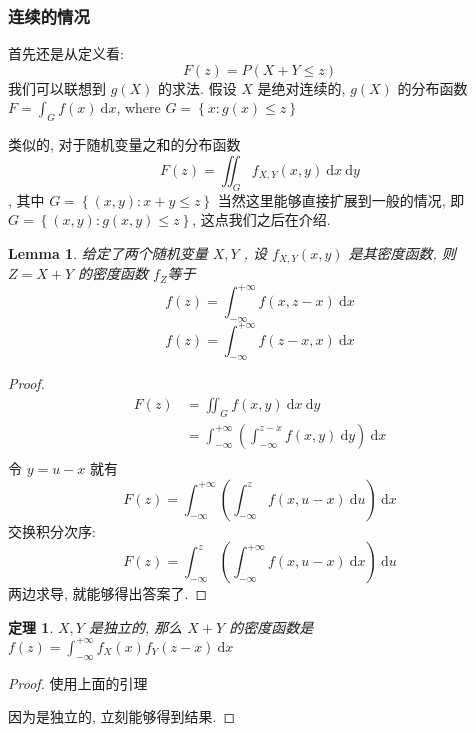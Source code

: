 \documentclass[a4paper, 10pt]{ctexart} %
\newtheorem{theorem}{定理}
\newtheorem{lemma}{Lemma}
\begin{document}
\subsubsection{连续的情况}
首先还是从定义看:
\[
F \left(z\right) = P\left(X + Y \le z\right)
\]
我们可以联想到 $g \left(X\right)$ 的求法. 假设 $X$ 是绝对连续的, $g\left(X\right)$ 的分布函数 $\displaystyle F = \int _{G} f \left(x \right) \ \mathrm{d}x$, where $G = \left\{ x: g\left(x\right) \le z\right\}$

类似的, 对于随机变量之和的分布函数
\[ \displaystyle F \left(z\right) = \iint _{G} f_{X , Y} \left(x,  y\right) \ \mathrm{d}x \ \mathrm{d}y\] , 其中 $G = \left\{ \left(x,  y\right) : x + y \le z\right\}$
当然这里能够直接扩展到一般的情况, 即 $G=  \left\{ \left( x,  y\right) : g\left(x , y\right) \le z\right\}$, 这点我们之后在介绍.
\begin{lemma}
    给定了两个随机变量 $X, Y$ , 设 $f _{X,   Y   } \left(x,  y\right)$ 是其密度函数, 则 $Z = X +  Y$ 的密度函数 $f _{Z}$等于 
    \[
    f \left(z\right)   = \int  ^{ + \infty} _{ - \infty} f \left( x, z -x\right) \ \mathrm{d}x
    \]\[
    f \left(z\right) = \int  ^{ + \infty    } _{ - \infty } f \left(z -x , x \right) \ \mathrm{d}x
    \]
\end{lemma}
\begin{proof}
    \[
    \begin{aligned}
    F \left(z \right) & = \iint  _{G} f\left(x,  y\right)  \ \mathrm{d}x \ \mathrm{d}y \\ 
    & = \int ^{ + \infty  } _{ - \infty}  \left( \int  ^{ z -x} _{ - \infty } f \left(x, y\right) \ \mathrm{d}y\right)\ \mathrm{d}x\\
    \end{aligned}
    \]
    令 $y  = u - x$ 就有 
    \[
    F \left(z\right)  = \int  ^{+\infty} _{ - \infty} \left( \int  ^{z} _{-\infty } f \left(x, u -x \right) \ \mathrm{d}u \right) \ \mathrm{d}x
    \]
    交换积分次序: 
    \[
    F \left(z\right) = \int ^{z} _{- \infty } \left( \int  ^{ +\infty} _{ -\infty} f \left(x, u-x\right)\ \mathrm{d}x \right)\ \mathrm{d}u
    \]
    两边求导, 就能够得出答案了.
\end{proof}

\begin{theorem}
    $X , Y$ 是独立的, 那么 $X + Y $ 的密度函数是 $f\left(z\right) = \displaystyle \int ^{ + \infty } _{-\infty  } f_{X} \left(x \right) f_{Y} \left(z - x\right) \ \mathrm{d} x$
\end{theorem}
\begin{proof}
    使用上面的引理

    因为是独立的, 立刻能够得到结果.
\end{proof}
\end{document}
